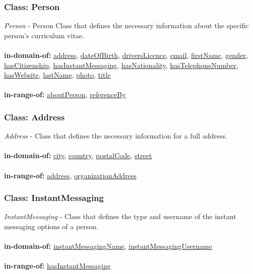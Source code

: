 \documentclass[a4paper,12pt]{article}
\numberwithin{equation}{section}
\begin{document}
\subsubsection{Class: Person}\hypertarget{Person}{}
\textit{Person} - Person Class that defines the necessary information about the specific person's curriculum vitae.
\\\\
\textbf{in-domain-of:} \hyperlink{address}{address}, \hyperlink{dateOfBirth}{dateOfBirth}, \hyperlink{driversLicence}{driversLicence}, \hyperlink{email}{email}, \hyperlink{firstName}{firstName},  \hyperlink{gender}{gender}, \hyperlink{hasCitizenship}{hasCitizenship}, \hyperlink{hasInstantMessaging}{hasInstantMessaging},  \hyperlink{hasNationality}{hasNationality}, \hyperlink{hasTelephoneNumber}{hasTelephoneNumber}, \hyperlink{hasWebsite}{hasWebsite}, \hyperlink{lastName}{lastName}, \hyperlink{photo}{photo}, \hyperlink{title}{title}
\\\\
\textbf{in-range-of:} \hyperlink{aboutPerson}{aboutPerson}, \hyperlink{referenceBy}{referenceBy}

\subsubsection{Class: Address}\hypertarget{Address}{}
\textit{Address} - Class that defines the necessary information for a full address.
\\\\
\textbf{in-domain-of:} \hyperlink{city}{city}, \hyperlink{country}{country}, \hyperlink{postalCode}{postalCode}, \hyperlink{street}{street}
\\\\
\textbf{in-range-of:} \hyperlink{address}{address}, \hyperlink{organizationAddress}{organizationAddress}

\subsubsection{Class: InstantMessaging}\hypertarget{InstantMessaging}{}
\textit{InstantMessaging} - Class that defines the type and username of the instant messaging options of a person.
\\\\
\textbf{in-domain-of:} \hyperlink{instantMessagingName}{instantMessagingName}, \hyperlink{instantMessagingUsername}{instantMessagingUsername}
\\\\
\textbf{in-range-of:} \hyperlink{hasInstantMessaging}{hasInstantMessaging}
\end{document}
